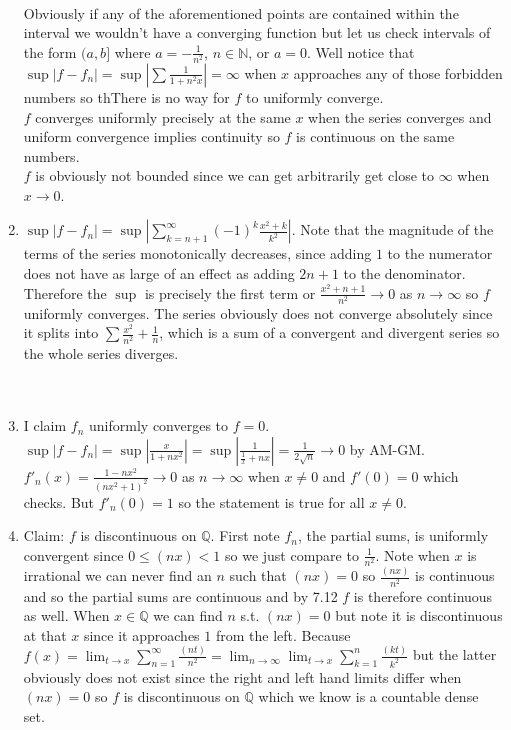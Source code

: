 \documentclass{article}
\begin{document}
\begin{enumerate}
\\ Obviously if any of the aforementioned points are contained within the interval we wouldn't have a converging function but let us check intervals of the form $(a, b]$ where $a=-\frac{1}{n^2}$, $n\in\mathbb{N}$, or $a=0$. Well notice that $\sup |f-f_n| = \sup |\sum \frac{1}{1+n^2x}| = \infty$ when $x$ approaches any of those forbidden numbers so thThere is no way for $f$ to uniformly converge. 
\\ $f$ converges uniformly precisely at the same $x$ when the series converges and uniform convergence implies continuity so $f$ is continuous on the same numbers.
\\ $f$ is obviously not bounded since we can get arbitrarily get close to $\infty$ when $x\rightarrow 0$.
\setcounter{enumi}{5}
\item $\sup |f-f_n|=\sup \left|\displaystyle\sum_{k=n+1}^{\infty} (-1)^k \frac{x^2+k}{k^2} \right|$. Note that the magnitude of the terms of the series monotonically decreases, since adding $1$ to the numerator does not have as large of an effect as adding $2n+1$ to the denominator. Therefore the $\sup$ is precisely the first term or $\frac{x^2+n+1}{n^2}\rightarrow 0$ as $n\rightarrow \infty$ so $f$ uniformly converges. The series obviously does not converge absolutely since it splits into $\sum \frac{x^2}{n^2} + \frac{1}{n}$, which is a sum of a convergent and divergent series so the whole series diverges. \\ \\ \\
\item I claim $f_n$ uniformly converges to $f=0$. $\sup |f-f_n| = \sup \left| \frac{x}{1+nx^2}\right|=\sup \left | \frac{1}{\frac{1}{x} + nx}\right|=\frac{1}{2\sqrt{n}}\rightarrow 0$ by AM-GM. 
\\ $f'_n (x) =\frac{1-nx^2}{(nx^2+1)^2}\rightarrow 0$ as $n\rightarrow\infty$ when $x\neq 0$ and $f'(0)=0$ which checks. But $f'_n (0) = 1$ so the statement is true for all $x\neq 0$.\\
\setcounter{enumi}{9}
\item Claim: $f$ is discontinuous on $\mathbb{Q}$. First note $f_n$, the partial sums, is uniformly convergent since $0 \leq (nx) < 1$ so we just compare to $\frac{1}{n^2}$. Note when $x$ is irrational we can never find an $n$ such that $(nx)=0$ so $\frac{(nx)}{n^2}$ is continuous and so the partial sums are continuous and by 7.12 $f$ is therefore continuous as well. When $x\in\mathbb{Q}$ we can find $n$ s.t. $(nx) = 0$ but note it is discontinuous at that $x$ since it approaches $1$ from the left. Because $f(x) = \displaystyle\lim_{t\rightarrow x} \sum_{n=1}^{\infty} \frac{(nt)}{n^2}=\lim_{n\rightarrow \infty} \lim_{t\rightarrow x} \sum_{k=1}^{n} \frac{(kt)}{k^2}$ but the latter obviously does not exist since the right and left hand limits differ when $(nx)=0$ so $f$ is discontinuous on $\mathbb{Q}$ which we know is a countable dense set.

\end{enumerate}
\end{document}
